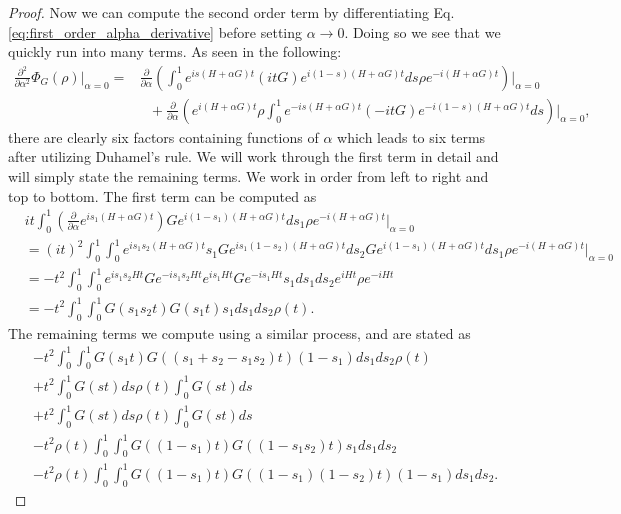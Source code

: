 \documentclass{article}
\newcommand{\parens}[1]{\left( #1 \right)}
\begin{document}
\begin{proof}
Now we can compute the second order term by differentiating Eq. \eqref{eq:first_order_alpha_derivative} before setting $\alpha \to 0$. Doing so we see that we quickly run into many terms. As seen in the following:
\begin{align}
    \frac{\partial^2}{\partial \alpha^2} \Phi_G(\rho) \bigg|_{\alpha = 0} =& \frac{\partial}{\partial \alpha} \parens{\int_{0}^{1} e^{i s (H+\alpha G)t} (i t G) e^{i (1-s) (H+\alpha G)t} ds \rho e^{-i(H+\alpha G)t}} \bigg|_{\alpha=0} \nonumber \\
    &\text{ } +\frac{\partial}{\partial \alpha} \parens{ e^{i(H+\alpha G)t} \rho \int_{0}^1 e^{-i s (H+\alpha G) t} (- i t G) e^{-i (1-s) (H+\alpha G)t} ds } \bigg|_{\alpha = 0},
\end{align}
there are clearly six factors containing functions of $\alpha$ which leads to six terms after utilizing Duhamel's rule. We will work through the first term in detail and will simply state the remaining terms. We work in order from left to right and top to bottom. The first term can be computed as
\begin{align}
    &i t\int_0^1 \parens{\frac{\partial}{\partial \alpha} e^{i s_1 (H+ \alpha G)t}} G e^{i(1-s_1)(H+\alpha G)t} ds_1 \rho e^{-i (H+\alpha G)t} \bigg|_{\alpha=0} \\
    &= (it)^2 \int_0^1 \int_0^1 e^{i s_1 s_2 (H+\alpha G)t} s_1 G e^{i s_1 (1-s_2) (H+\alpha G)t} ds_2 G e^{i(1-s_1) (H+\alpha G)t} ds_1 \rho e^{-i(H+\alpha G) t} \bigg|_{\alpha=0} \\
    &= -t^2 \int_0^1 \int_0^1 e^{i s_1 s_2 H t} G e^{-i s_1 s_2 H t} e^{i s_1 H t} G e^{-i s_1 H t} s_1 ds_1 ds_2 e^{i H t} \rho e^{-i H t} \\
    &= -t^2 \int_0^1 \int_0^1 G(s_1 s_2 t) G(s_1 t) s_1 ds_1 ds_2 \rho(t). \label{eq:second_deriv_alpha_first_term}
\end{align}
The remaining terms we compute using a similar process, and are stated as
\begin{align}
    & -t^2 \int_0^1 \int_0^1 G(s_1 t) G((s_1 + s_2 - s_1 s_2) t) (1-s_1) ds_1 ds_2 \rho (t) \\
    & +t^2 \int_0^1 G(st) ds \rho(t) \int_0^1 G(st) ds \\
    & +t^2 \int_0^1 G(st) ds \rho(t) \int_0^1 G(st) ds \\
    & -t^2 \rho(t) \int_0^1 \int_0^1 G((1-s_1)t) G((1-s_1 s_2) t) s_1 ds_1 ds_2 \\
    & -t^2 \rho(t) \int_0^1 \int_0^1 G((1-s_1)t) G((1-s_1)(1 - s_2) t) (1-s_1) ds_1 ds_2. \label{eq:second_deriv_alpha_last_term}

\end{align}
\end{proof}
\end{document}
